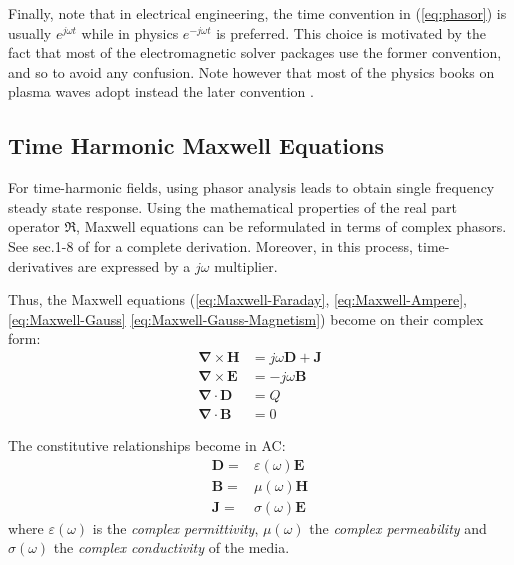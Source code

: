 Finally, note that in electrical engineering, the time convention in (\ref{eq:phasor}) is usually $e^{j\omega t}$ while in physics $e^{-j\omega t}$ is preferred\parencite{Bradley2007, Michelsen2017}. This choice is motivated by the fact that most of the electromagnetic solver packages use the former convention, and so to avoid any confusion. Note however that most of the physics books on plasma waves adopt instead the later convention \parencite{Swanson2003, Stix1992, Brambilla1998}.


\subsection{Time Harmonic Maxwell Equations}
For time-harmonic fields, using phasor analysis leads to obtain single frequency steady state response. Using the mathematical properties of the real part operator $\Re$, Maxwell equations can be reformulated in terms of complex phasors. See sec.1-8 of \parencite{Harrington2001} for a complete derivation. Moreover, in this process, time-derivatives are expressed by a $j\omega$ multiplier.  

Thus, the Maxwell equations (\ref{eq:Maxwell-Faraday}, \ref{eq:Maxwell-Ampere}, \ref{eq:Maxwell-Gauss} \ref{eq:Maxwell-Gauss-Magnetism}) become on their complex form:
\begin{subequations}
 \begin{align}
  \boldsymbol{\nabla} \times \mathbf{H} &= j\omega\mathbf{D} + \mathbf{J}  \label{eq:Maxwell-Faraday-Harmonic} \\
  \boldsymbol{\nabla} \times \mathbf{E} &= -j\omega\mathbf{B} \label{eq:Maxwell-Ampere-Harmonic} \\
  \boldsymbol{\nabla} \cdot \mathbf{D} &= Q \label{eq:Maxwell-Gauss-Harmonic} \\
  \boldsymbol{\nabla} \cdot \mathbf{B} &= 0 \label{eq:Maxwell-Gauss-Magnetism-Harmonic} 
 \end{align}
\end{subequations}

The constitutive relationships become in AC:
\begin{subequations}
 \begin{align}
  \mathbf{D} =& \varepsilon(\omega) \mathbf{E} \\
  \mathbf{B} =& \mu(\omega) \mathbf{H} \\
  \mathbf{J} =& \sigma(\omega) \mathbf{E}
 \end{align}
\end{subequations}
where $\varepsilon(\omega)$ is the \emph{complex permittivity}, $\mu(\omega)$ the \emph{complex permeability} and $\sigma(\omega)$ the \emph{complex conductivity} of the media. 

